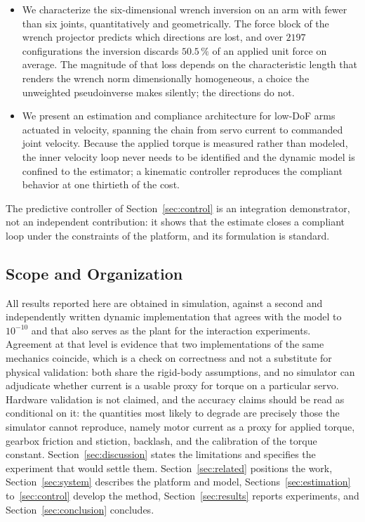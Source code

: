 \documentclass{ieeeaccess}
\begin{document}
\begin{itemize}[leftmargin=*]
\item We characterize the six-dimensional wrench inversion on an arm with fewer
than six joints, quantitatively and geometrically. The force block of the wrench
projector predicts which directions are lost, and over $2197$ configurations the
inversion discards $50.5\,\%$ of an applied unit force on average. The magnitude
of that loss depends on the characteristic length that renders the wrench norm
dimensionally homogeneous, a choice the unweighted pseudoinverse makes silently;
the directions do not.

\item We present an estimation and compliance architecture for low-DoF arms
actuated in velocity, spanning the chain from servo current to commanded joint
velocity. Because the applied torque is measured rather than modeled, the inner
velocity loop never needs to be identified and the dynamic model is confined to
the estimator; a kinematic controller reproduces the compliant behavior at one
thirtieth of the cost.
\end{itemize}

The predictive controller of Section~\ref{sec:control} is an integration
demonstrator, not an independent contribution: it shows that the estimate closes a
compliant loop under the constraints of the platform, and its formulation is
standard.

\subsection{Scope and Organization}
All results reported here are obtained in simulation, against a second and
independently written dynamic implementation that agrees with the model to
$10^{-10}$ and that also serves as the plant for the interaction experiments.
Agreement at that level is evidence that two implementations of the same
mechanics coincide, which is a check on correctness and not a substitute for
physical validation: both share the rigid-body assumptions, and no simulator can
adjudicate whether current is a usable proxy for torque on a particular servo.
Hardware validation is not claimed, and the accuracy
claims should be read as conditional on it: the quantities most likely to degrade
are precisely those the simulator cannot reproduce, namely motor current as a proxy
for applied torque, gearbox friction and stiction, backlash, and the calibration of
the torque constant. Section~\ref{sec:discussion} states the limitations and
specifies the experiment that would settle them. Section~\ref{sec:related}
positions the work,
Section~\ref{sec:system} describes the platform and model,
Sections~\ref{sec:estimation} to~\ref{sec:control} develop the method,
Section~\ref{sec:results} reports experiments, and Section~\ref{sec:conclusion}
concludes.
\end{document}
